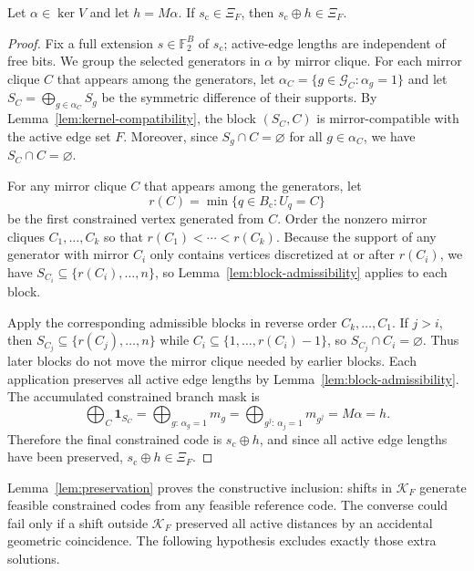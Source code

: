 \begin{lemma}
\label{lem:preservation}
Let $\alpha \in \ker V$ and let $h = M\alpha$. If $s_{\mathrm{c}} \in \Xi_F$, then $s_{\mathrm{c}} \oplus h \in \Xi_F$.
\end{lemma}

\begin{proof}
Fix a full extension $s\in\mathbb{F}_2^B$ of $s_{\mathrm{c}}$; active-edge lengths are independent of free bits. We group the selected generators in $\alpha$ by mirror clique. For each mirror clique $C$ that appears among the generators, let $\alpha_C = \{g \in \mathcal{G}_C : \alpha_g = 1\}$ and let $S_C = \bigoplus_{g \in \alpha_C} S_g$ be the symmetric difference of their supports. By Lemma~\ref{lem:kernel-compatibility}, the block $(S_C, C)$ is mirror-compatible with the active edge set $F$. Moreover, since $S_g \cap C = \varnothing$ for all $g \in \alpha_C$, we have $S_C \cap C = \varnothing$.

For any mirror clique $C$ that appears among the generators, let
\[
r(C)=\min\{q\in B_{\mathrm{c}}: U_q=C\}
\]
be the first constrained vertex generated from $C$. Order the nonzero mirror cliques $C_1,\ldots,C_k$ so that $r(C_1)<\cdots<r(C_k)$. Because the support of any generator with mirror $C_i$ only contains vertices discretized at or after $r(C_i)$, we have $S_{C_i}\subseteq\{r(C_i),\ldots,n\}$, so Lemma~\ref{lem:block-admissibility} applies to each block.

Apply the corresponding admissible blocks in reverse order $C_k,\ldots,C_1$. If $j>i$, then $S_{C_j}\subseteq\{r(C_j),\ldots,n\}$ while $C_i\subseteq\{1,\ldots,r(C_i)-1\}$, so $S_{C_j}\cap C_i=\varnothing$. Thus later blocks do not move the mirror clique needed by earlier blocks. Each application preserves all active edge lengths by Lemma~\ref{lem:block-admissibility}. The accumulated constrained branch mask is
\[
\bigoplus_C \mathbf{1}_{S_C}
=
\bigoplus_{g:\,\alpha_g=1} m_g
=
\bigoplus_{g^j:\,\alpha_j=1} m_{g^j}
=
M\alpha
=
h.
\]
Therefore the final constrained code is $s_{\mathrm{c}}\oplus h$, and since all active edge lengths have been preserved, $s_{\mathrm{c}}\oplus h\in\Xi_F$.
\end{proof}

Lemma~\ref{lem:preservation} proves the constructive inclusion: shifts in $\mathcal{K}_F$ generate feasible constrained codes from any feasible reference code. The converse could fail only if a shift outside $\mathcal{K}_F$ preserved all active distances by an accidental geometric coincidence. The following hypothesis excludes exactly those extra solutions.

